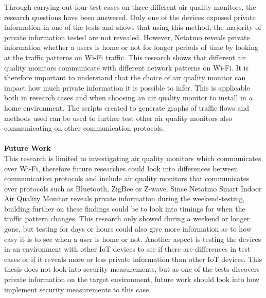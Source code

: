 Through carrying out four test cases on three different air quality monitors, the research questions have been answered. Only one of the devices exposed private information in one of the tests and shows that using this method, the majority of private information tested are not revealed. However, Netatmo reveals private information whether a users is home or not for longer periods of time by looking at the traffic patterns on \gls{Wi-Fi} traffic. This research shows that different air quality monitors communicate with different network patterns on \gls{Wi-Fi}. It is therefore important to understand that the choice of air quality monitor can impact how much private information it is possible to infer. This is applicable both in research cases and when choosing an air quality monitor to install in a home environment. The scripts created to generate graphs of traffic flows and methods used can be used to further test other air quality monitors also communicating on other communication protocols.
\\\\
\textbf{Future Work}
\\
This research is limited to investigating air quality monitors which communicates over \gls{Wi-Fi}, therefore future researches could look into differences between communication protocols and include air quality monitors that communicates over protocols such as Bluetooth, ZigBee or Z-wave. Since Netatmo Smart Indoor Air Quality Monitor reveals private information during the weekend-testing, building further on these findings could be to look into timings for when the traffic pattern changes. This research only showed during a weekend or longer gone, but testing for days or hours could also give more information as to how easy it is to see when a user is home or not. Another aspect is testing the devices in an environment with other \gls{IoT} devices to see if there are differences in test cases or if it reveals more or less private information than other \gls{IoT} devices. This thesis does not look into security measurements, but as one of the tests discovers private information on the target environment, future work should look into how implement security measurements to this case. 
